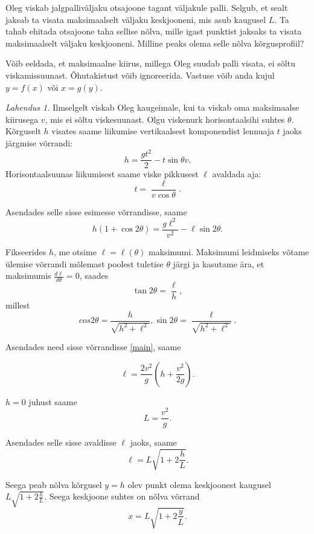 \setAuthor{}

Oleg viskab jalgpalliväljaku otsajoone tagant väljakule palli. Selgub, et sealt
jaksab ta visata maksimaalselt väljaku keskjooneni, mis asub kaugusel $L$. Ta
tahab ehitada otsajoone taha sellise nõlva, mille igast punktist jaksaks ta visata
maksimaalselt väljaku keskjooneni. Milline peaks olema selle nõlva kõrgusprofiil?

Võib eeldada, et maksimaalne kiirus, millega Oleg suudab palli visata, ei sõltu
viskamissuunast. Õhutakistust võib ignoreerida. Vastuse võib anda kujul $y=f(x)$
või $x=g(y)$.




\hint

\solu
\emph{Lahendus 1.}
Ilmselgelt viskab Oleg kaugeimale, kui ta viskab oma maksimaalse kiirusega $v$, mis ei sõltu viskesuunast. Olgu viskenurk horisontaalsihi suhtes $\theta$. Kõrguselt $h$ visates saame liikumise vertikaalsest komponendist lennuaja $t$ jaoks järgmise võrrandi:
\[h=\frac{gt^2}{2}-t\sin \theta v.\]
Horisontaalsuunas liikumisest saame viske pikkusest $\ell$ avaldada aja:
\[t=\frac{\ell}{v\cos \theta}.\]

Asendades selle sisse esimesse võrrandisse, saame
\begin{equation}\label{main}
    h(1+\cos 2\theta)=\frac{g\ell^2}{v^2}-\ell\sin 2\theta.
\end{equation}

Fikseerides $h$, me otsime $\ell=\ell(\theta)$ maksimumi. Maksimumi leidmiseks võtame ülemise võrrandi mõlemast poolest tuletise $\theta$ järgi ja kasutame ära, et maksimumis $\frac{d\ell}{d\theta}=0$, saades
\[\tan 2\theta=\frac{\ell}{h},\]
millest
\[cos2\theta=\frac{h}{\sqrt{h^2+\ell^2}}, \sin 2\theta=\frac{\ell}{\sqrt{h^2+\ell^2}}.\]

Asendades need sisse võrrandisse \ref{main}, saame

\[\ell=\frac{2v^2}{g}\left(h+\frac{v^2}{2g}\right).\]

$h=0$ juhust saame
\[L=\frac{v^2}{g}.\]

Asendades selle sisse avaldisse $\ell$ jaoks, saame
\[\ell=L\sqrt{1+2\frac{h}{L}}.\]

Seega peab nõlva kõrgusel $y=h$ olev punkt olema keskjoonest kaugusel $L\sqrt{1+2\frac{h}{L}}$. Seega keskjoone suhtes on nõlva võrrand
\[x=L\sqrt{1+2\frac{y}{L}}.\]

